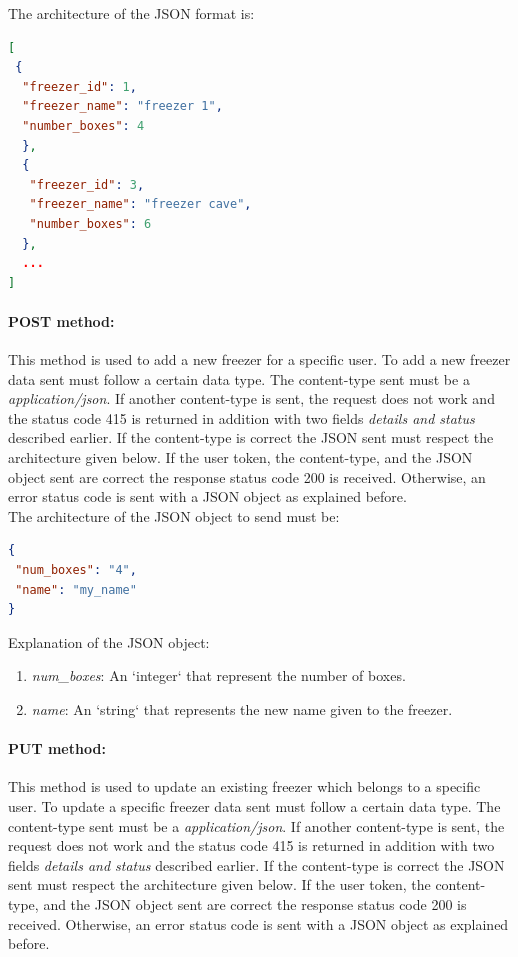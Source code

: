 The architecture of the JSON format is:
\begin{lstlisting}[language=json]
[
 {
  "freezer_id": 1,
  "freezer_name": "freezer 1",
  "number_boxes": 4
  },
  {
   "freezer_id": 3,
   "freezer_name": "freezer cave",
   "number_boxes": 6
  },
  ...
]
\end{lstlisting}

\paragraph{POST method:} This method is used to add a new freezer for a specific user. To add a new freezer data sent must follow a certain data type. The content-type sent must be a \textit{application/json}. If another content-type is sent, the request does not work and the status code 415 is returned in addition with two fields \textit{details and status} described earlier. If the  content-type is correct the JSON sent must respect the architecture given below. If the user token, the  content-type, and the JSON object sent are correct the response status code 200 is received. Otherwise, an error status code is sent with a JSON object as explained before.\\

The architecture of the JSON object to send must be:
\begin{lstlisting}[language=json]
{
 "num_boxes": "4",
 "name": "my_name"
}
\end{lstlisting}

Explanation of the  JSON object:
\begin{enumerate}
\item \textit{num\_boxes}: An `integer` that represent the number of boxes.
\item \textit{name}: An `string` that represents the new name given to the freezer.
\end{enumerate}

\paragraph{PUT method:} This method is used to update an existing freezer which belongs to a specific user. To update a specific freezer data sent must follow a certain data type. The content-type sent must be a \textit{application/json}. If another content-type is sent, the request does not work and the status code 415 is returned in addition with two fields \textit{details and status} described earlier. If the  content-type is correct the JSON sent must respect the architecture given below. If the user token, the  content-type, and the JSON object sent are correct the response status code 200 is received. Otherwise, an error status code is sent with a JSON object as explained before.\\

